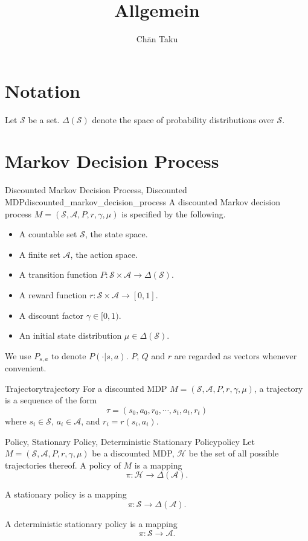 \documentclass{article}
\title{Allgemein}
\author{Ch\=an Taku}
\begin{document}
\maketitle

\section*{Notation}

Let $\mathcal{S}$ be a set.
$\Delta(\mathcal{S})$ denote the space of probability distributions over $\mathcal{S}$.

\section{Markov Decision Process}

\begin{definition}{Discounted Markov Decision Process, Discounted MDP}{discounted_markov_decision_process}
    A discounted Markov decision process $M=(\mathcal{S}, \mathcal{A}, P, r, \gamma, \mu)$ is specified by the following.
    \begin{itemize}
        \item A countable set $\mathcal{S}$, the state space.
        \item A finite set $\mathcal{A}$, the action space.
        \item A transition function $P: \mathcal{S} \times \mathcal{A} \rightarrow \Delta(\mathcal{S})$.
        \item A reward function $r: \mathcal{S} \times \mathcal{A} \rightarrow [0,1]$.
        \item A discount factor $\gamma\in [0,1)$.
        \item An initial state distribution $\mu\in \Delta(\mathcal{S})$.
    \end{itemize}
\end{definition}

We use $P_{s,a}$ to denote $P(\cdot | s, a)$.
$P$, $Q$ and $r$ are regarded as vectors whenever convenient.

\begin{definition}{Trajectory}{trajectory}
    For a discounted MDP $M=(\mathcal{S}, \mathcal{A}, P, r, \gamma, \mu)$, a trajectory is a sequence of the form
    \[ \tau = (s_0,a_0,r_0,\cdots,s_t,a_t,r_t) \]
    where $s_i\in \mathcal{S}$, $a_i\in \mathcal{A}$, and $r_i = r(s_i,a_i)$.
\end{definition}

\begin{definition}{Policy, Stationary Policy, Deterministic Stationary Policy}{policy}
    Let $M=(\mathcal{S}, \mathcal{A}, P, r, \gamma, \mu)$ be a discounted MDP, $\mathcal{H}$ be the set of all possible trajectories thereof.
    A policy of $M$ is a mapping
    \[ \pi: \mathcal{H} \rightarrow \Delta(\mathcal{A}). \]
    \par
    A stationary policy is a mapping
    \[ \pi: \mathcal{S} \rightarrow \Delta(\mathcal{A}). \]
    \par
    A deterministic stationary policy is a mapping
    \[ \pi: \mathcal{S} \rightarrow \mathcal{A}. \]
\end{definition}
\end{document}

